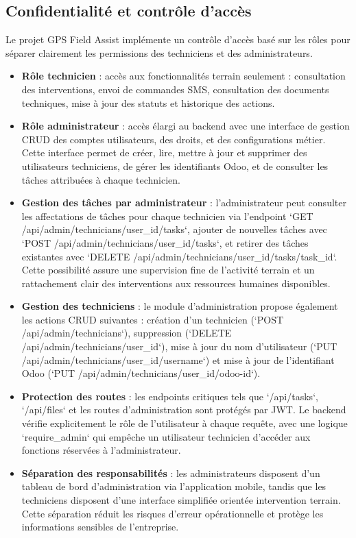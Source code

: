 \documentclass[12pt,a4paper]{report}
\begin{document}
\subsection{Confidentialité et contrôle d'accès}
\noindent Le projet GPS Field Assist implémente un contrôle d'accès basé sur les rôles pour séparer clairement les permissions des techniciens et des administrateurs.
\begin{itemize}
    \item \textbf{Rôle technicien} : accès aux fonctionnalités terrain seulement : consultation des interventions, envoi de commandes SMS, consultation des documents techniques, mise à jour des statuts et historique des actions.
    \item \textbf{Rôle administrateur} : accès élargi au backend avec une interface de gestion CRUD des comptes utilisateurs, des droits, et des configurations métier. Cette interface permet de créer, lire, mettre à jour et supprimer des utilisateurs techniciens, de gérer les identifiants Odoo, et de consulter les tâches attribuées à chaque technicien.
    \item \textbf{Gestion des tâches par administrateur} : l'administrateur peut consulter les affectations de tâches pour chaque technicien via l'endpoint `GET /api/admin/technicians/{user_id}/tasks`, ajouter de nouvelles tâches avec `POST /api/admin/technicians/{user_id}/tasks`, et retirer des tâches existantes avec `DELETE /api/admin/technicians/{user_id}/tasks/{task_id}`. Cette possibilité assure une supervision fine de l'activité terrain et un rattachement clair des interventions aux ressources humaines disponibles.
    \item \textbf{Gestion des techniciens} : le module d'administration propose également les actions CRUD suivantes : création d'un technicien (`POST /api/admin/technicians`), suppression (`DELETE /api/admin/technicians/{user_id}`), mise à jour du nom d'utilisateur (`PUT /api/admin/technicians/{user_id}/username`) et mise à jour de l'identifiant Odoo (`PUT /api/admin/technicians/{user_id}/odoo-id`).
    \item \textbf{Protection des routes} : les endpoints critiques tels que `/api/tasks`, `/api/files` et les routes d'administration sont protégés par JWT. Le backend vérifie explicitement le rôle de l'utilisateur à chaque requête, avec une logique `require_admin` qui empêche un utilisateur technicien d'accéder aux fonctions réservées à l'administrateur.
    \item \textbf{Séparation des responsabilités} : les administrateurs disposent d'un tableau de bord d'administration via l'application mobile, tandis que les techniciens disposent d'une interface simplifiée orientée intervention terrain. Cette séparation réduit les risques d'erreur opérationnelle et protège les informations sensibles de l'entreprise.
\end{itemize}
\end{document}
